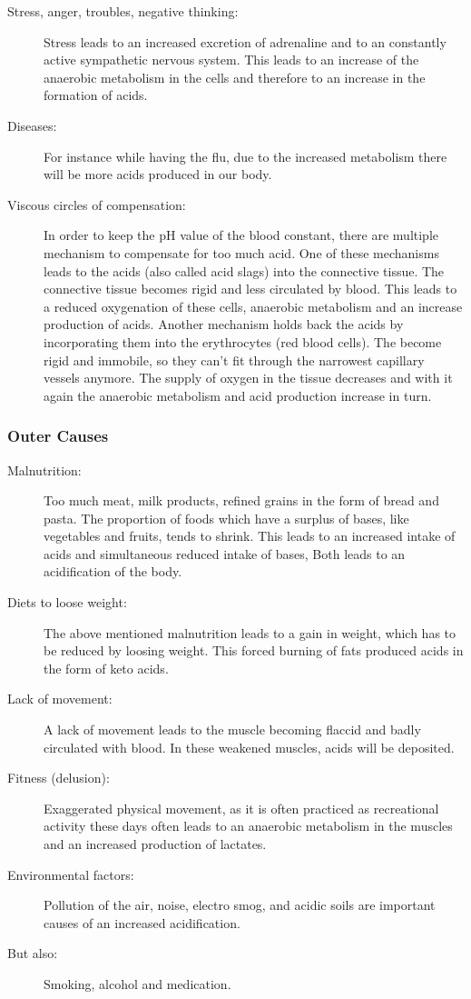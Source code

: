 \documentclass[../main.tex]{subfiles}
\begin{document}
\begin{description}
\item[Stress, anger, troubles, negative thinking:] Stress leads to an increased excretion of adrenaline
  and to an constantly active sympathetic nervous system. This leads to an increase of the anaerobic metabolism
  in the cells and therefore to an increase in the formation of acids.
\item[Diseases:] For instance while having the flu, due to the increased metabolism there will be more acids produced in our body.
\item[Viscous circles of compensation:] In order to keep the pH value of the blood constant,
  there are multiple mechanism to compensate for too much acid.
  One of these mechanisms leads to the acids (also called acid slags) into the connective tissue.
  The connective tissue becomes rigid and less circulated by blood.
  This leads to a reduced oxygenation of these cells, anaerobic metabolism and an increase production of acids.
  Another mechanism holds back the acids by incorporating them into the erythrocytes (red blood cells).
  The become rigid and immobile, so they can't fit through the narrowest capillary vessels anymore.
  The supply of oxygen in the tissue decreases and with it again the anaerobic metabolism and acid production increase in turn.
\end{description}

\subsubsection{Outer Causes}

\begin{description}
\item[Malnutrition:] Too much meat, milk products, refined grains in the form of bread and pasta.
  The proportion of foods which have a surplus of bases, like vegetables and fruits, tends to shrink.
  This leads to an increased intake of acids and simultaneous reduced intake of bases,
  Both leads to an acidification of the body.
\item[Diets to loose weight:] The above mentioned malnutrition leads to a gain in weight,
  which has to be reduced by loosing weight.
  This forced burning of fats produced acids in the form of keto acids.
\item[Lack of movement:] A lack of movement leads to the muscle becoming flaccid and badly circulated with blood.
  In these weakened muscles, acids will be deposited.
\item[Fitness (delusion):] Exaggerated physical movement, as it is often practiced as recreational activity these days often leads to
  an anaerobic metabolism in the muscles and an increased production of lactates.
\item[Environmental factors:] Pollution of the air, noise, electro smog, and acidic soils are important causes of an increased acidification.
\item[But also:] Smoking, alcohol and medication.
\end{description}
\end{document}

